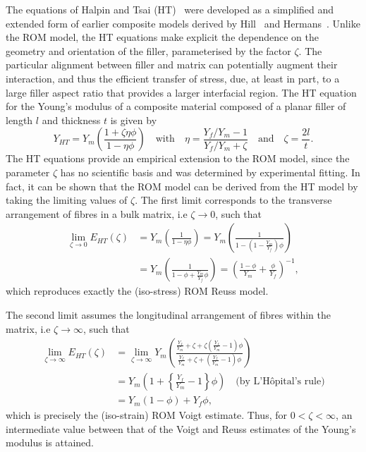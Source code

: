 The equations of Halpin and Tsai (HT)~\cite{doi:10.1177/002199836900300419,PEN:PEN760160512} 
were developed as a simplified and extended form 
of earlier composite models 
derived by Hill~\cite{0370-1298-65-5-307} 
and Hermans~\cite{hermans1967koninklijke}.
%
Unlike the ROM model, 
the HT equations make explicit the dependence on 
the geometry and orientation of the filler, 
parameterised by the factor $\zeta$.
%
The particular alignment 
between filler and matrix
can potentially augment 
their interaction, 
and thus the efficient transfer of stress, 
due, at least in part, to a large filler aspect ratio 
that provides a larger interfacial region.
%
The HT equation for the 
Young's modulus of a composite material 
composed of a planar filler 
of length $l$ and thickness $t$ 
is given by 
%
\begin{equation}
Y_{HT}=Y_m\left(\frac{1+\zeta\eta\phi}{1-\eta\phi}\right)
\quad\mbox{with}\quad
\eta=\frac{Y_f/Y_m-1}{Y_f/Y_m+\zeta}
\quad\mbox{and}\quad
\zeta=\frac{2l}{t}.
\end{equation}
%
The HT equations provide 
an empirical extension to the ROM model, 
since the parameter $\zeta$ 
has no scientific basis 
and was determined 
by experimental fitting.
%
In fact, it can be shown 
that the ROM model can 
be derived from the HT model 
by taking the limiting values of $\zeta$.
%
The first limit corresponds to the 
transverse arrangement of fibres 
in a bulk matrix, 
i.e $\zeta \to 0$, such that  
%
\begin{align}
\lim_{\zeta\to0}E_{HT}(\zeta)&=Y_m\left(\frac{1}{1-\eta\phi}\right) =Y_m\left(\frac{1}{1-(1-\frac{Y_m}{Y_f})\phi}\right) \nonumber\\[10pt]
&=Y_m\left(\frac{1}{1-\phi+\frac{Y_m}{Y_f}\phi}\right)=\left(\frac{1-\phi}{Y_m}+\frac{\phi}{Y_f}\right)^{-1}, 
\end{align}
%
which reproduces exactly the 
(iso-stress) ROM Reuss model.

The second limit assumes 
the longitudinal arrangement of fibres 
within the matrix, 
i.e $\zeta \to \infty$, such that  
%
\begin{align}
\lim_{\zeta\to\infty}E_{HT}(\zeta)
&=\lim_{\zeta\to\infty}Y_m\left(\frac{\frac{Y_f}{Y_m}+\zeta+\zeta(\frac{Y_f}{Y_m}-1)\phi}{\frac{Y_f}{Y_m}+\zeta+(\frac{Y_f}{Y_m}-1)\phi}\right)\nonumber\\[10pt]
&=Y_m\left(1+\left\{\frac{Y_f}{Y_m}-1\right\}\phi\right) \quad\mbox{(by L'H\^opital's rule)}\nonumber \\[10pt]
&=Y_m(1-\phi)+Y_f\phi,
\end{align}
%
which is precisely the 
(iso-strain) ROM Voigt estimate.
%
Thus, for $0<\zeta<\infty$, 
an intermediate value 
between that of the 
Voigt and Reuss estimates 
of the Young's modulus 
is attained.

